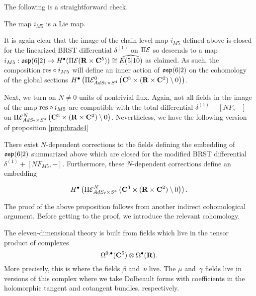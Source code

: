 \documentclass[../main.tex]{subfiles}
\begin{document}
The following is a straightforward check.
\begin{lem}\label{lem:m5emb}
The map $i_{M5}$ is a Lie map.
\end{lem} 

It is again clear that the image of the chain-level map $i_{M5}$ defined above is closed for the linearized BRST differential $\delta^{(1)}$ on $\Pi \mathcal{E}$ so descends to a map $i_{M5} : \mathfrak{osp}(6|2) \to H^\bullet (\Pi \mathcal{E} (\mathbf{R}\times \mathbf{C}^5))\cong \widehat{E (5|10)}$ as claimed. As such, the composition $\mathrm{res}\circ i_{M5}$ will define an inner action of $\mathfrak{osp}(6|2)$ on the cohomology of the global sections $H^\bullet \left ( \Pi \mathcal{E}^{0}_{AdS_7\times S^4} \left ( \mathbf{C}^3\times (\mathbf{R}\times \mathbf{C}^2)\setminus 0\right )\right )$. 

\parsec[]

Next, we turn on $N \ne 0$  units of nontrivial flux. Again, not all fields in the image of the map $\mathrm{res}\circ i_{M5}$ are compatible with the total differential $\delta^{(1)} + [N F, -]$ on $\Pi \mathcal{E}^{N}_{AdS_7\times S^4} \left ( \mathbf{C}^3\times (\mathbf{R}\times \mathbf{C}^2)\setminus 0\right )$. Nevertheless, we have the following version of proposition \ref{prop:brads4}

\begin{prop}
\label{prop:brads7}
There exist $N$-dependent corrections to the fields defining the embedding of $\mathfrak{osp}(6|2)$ summarized above which are closed for the modified BRST differential $\delta^{(1)} + [N F_{M5},-]$. Furthermore, these $N$-dependent corrections define an embedding 

\[ H^\bullet \left ( \Pi \mathcal{E}^N_{AdS_7\times S^4} \left ( \mathbf{C}^3 \times (\mathbf{R}\times \mathbf{C}^2)\setminus 0 \right ) \right). \]

\end{prop}

\iffalse
\parsec[s:thfcohomology]

The proof of the above proposition follows from another indirect cohomological argument. 
Before getting to the proof, we introduce the relevant cohomology. 

The eleven-dimensional theory is built from fields which live in the tensor product of complexes 
\[
\Omega^{0,\bullet}(\mathbf{C}^5) \otimes \Omega^\bullet(\mathbf{R}).
\]
More precisely, this is where the  fields $\beta$ and~$\nu$ live. 
The $\mu$ and~$\gamma$ fields live in versions of this complex where we take Dolbeault forms with coefficients in the holomorphic tangent and cotangent bundles, respectively. 
\end{document}
